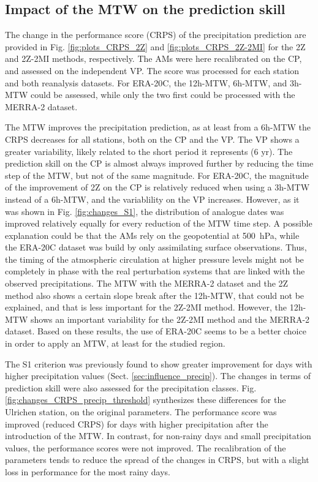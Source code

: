 \documentclass[hess, manuscript]{copernicus}
\begin{document}
	
	\subsection{Impact of the MTW on the prediction skill}
	\label{sec:influence_scores}
	
	The change in the performance score (CRPS) of the precipitation prediction are provided in Fig. \ref{fig:plots_CRPS_2Z} and \ref{fig:plots_CRPS_2Z-2MI} for the 2Z and 2Z-2MI methods, respectively. The AMs were here recalibrated on the CP, and assessed on the independent VP. The score was processed for each station and both reanalysis datasets. For ERA-20C, the 12h-MTW, 6h-MTW, and 3h-MTW could be assessed, while only the two first could be processed with the MERRA-2 dataset.
	
	The MTW improves the precipitation prediction, as at least from a 6h-MTW the CRPS decreases for all stations, both on the CP and the VP. The VP shows a greater variability, likely related to the short period it represents (6 yr). The prediction skill on the CP is almost always improved further by reducing the time step of the MTW, but not of the same magnitude. For ERA-20C, the magnitude of the improvement of 2Z on the CP is relatively reduced when using a 3h-MTW instead of a 6h-MTW, and the variablility on the VP increases. However, as it was shown in Fig. \ref{fig:changes_S1}, the distribution of analogue dates was improved relatively equally for every reduction of the MTW time step. A possible explanation could be that the AMs rely on the geopotential at 500~hPa, while the ERA-20C dataset was build by only assimilating surface observations. Thus, the timing of the atmospheric circulation at higher pressure levels might not be completely in phase with the real perturbation systems that are linked with the observed precipitations. The MTW with the MERRA-2 dataset and the 2Z method also shows a certain slope break after the 12h-MTW, that could not be explained, and that is less important for the 2Z-2MI method. However, the 12h-MTW shows an important variability for the 2Z-2MI method and the MERRA-2 dataset. 
	Based on these results, the use of ERA-20C seems to be a better choice in order to apply an MTW, at least for the studied region.
	
	The S1 criterion was previously found to show greater improvement for days with higher precipitation values (Sect. \ref{sec:influence_precip}). The changes in terms of prediction skill were also assessed for the precipitation classes. Fig. \ref{fig:changes_CRPS_precip_threshold} synthesizes these differences for the Ulrichen station, on the original parameters. The performance score was improved (reduced CRPS) for days with higher precipitation after the introduction of the MTW. In contrast, for non-rainy days and small precipitation values, the performance scores were not improved. The recalibration of the parameters tends to reduce the spread of the changes in CRPS, but with a slight loss in performance for the most rainy days.
	
\end{document}
